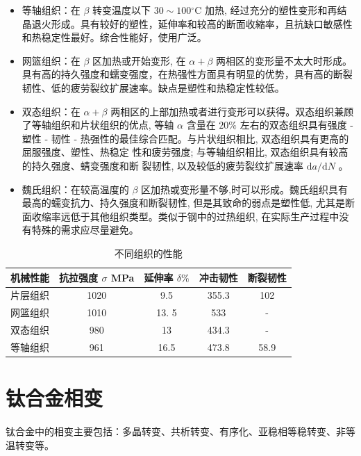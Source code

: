 \begin{itemize}
	\item 	等轴组织：在 $\beta$ 转变温度以下 $30 \sim 100{ }^{\circ} \mathrm{C}$ 加热, 经过充分的塑性变形和再结晶退火形成。具有较好的塑性，延伸率和较高的断面收縮率，且抗缺口敏感性和热稳定性最好。综合性能好，使用广泛。
	\item 	网篮组织：在 $\beta$ 区加热或开始变形, 在 $\alpha+\beta$ 两相区的变形量不太大时形成。具有高的持久强度和蠕变强度，在热强性方面具有明显的优势，具有高的断裂韧性、低的疲劳裂纹扩展速率。缺点是塑性和热稳定性较低。
	\item 	双态组织：在 $\alpha+\beta$ 两相区的上部加热或者进行变形可以获得。双态组织兼顾了等轴组织和片状组织的优点, 等轴 $\alpha$ 含量在 $20 \%$ 左右的双态组织具有强度 - 塑性 - 韧性 - 热强性的最佳综合匹配。与片状组织相比, 双态组织具有更高的屈服强度、塑性、热稳定 性和疲劳强度; 与等轴组织相比, 双态组织具有较高的持久强度、蜻变强度和断 裂韧性, 以及较低的疲劳裂纹扩展速率 $\mathrm{d} a / \mathrm{d} N$ 。
	\item 	魏氏组织：在较高温度的 $\beta$ 区加热或变形量不够,时可以形成。魏氏组织具有最高的蠕变抗力、持久强度和断裂韧性, 但是其致命的弱点是塑性低, 尤其是断面收缩率远低于其他组织类型。类似于钢中的过热组织, 在实际生产过程中没有特殊的需求应尽量避免。
\end{itemize}

\begin{table}[htbp]
	\centering
	\label{sec:detial}
	\caption{不同组织的性能}
	\begin{tabular}{ccccc}
		\hline
		机械性能 & 抗拉强度 $ \sigma$ MPa & 延伸率 $\delta\%$ & 冲击韧性& 断裂韧性 \\  \hline
		片层组织 & 1020 & 9.5 & 355.3 & 102 \\
		网篮组织 & 1010 & 13. 5 & 533 & - \\
		双态组织 & 980 & 13 & 434.3 & - \\
		等轴组织 & 961 & 16.5 & 473.8 & 58.9 \\ \hline
	\end{tabular}
\end{table}
\section{钛合金相变}
钛合金中的相变主要包括：多晶转变、共析转变、有序化、亚稳相等稳转变、非等温转变等。

